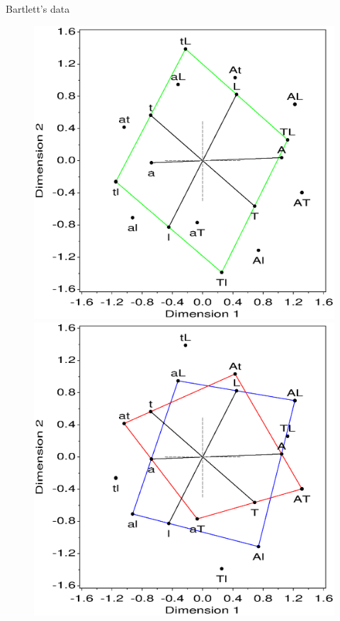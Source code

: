 \begin{Example}[bartlett]{Bartlett's data}
\begin{figure}[htb]
 \begin{minipage}[t]{.49\linewidth}
  \includegraphics[width=1\linewidth]{ch5/fig/mcabart2}
 \end{minipage}%
 \hfill
 \begin{minipage}[t]{.49\linewidth}
  \includegraphics[width=1\linewidth]{ch5/fig/mcabart3}

\end{minipage}
\end{figure}
\end{Example}
